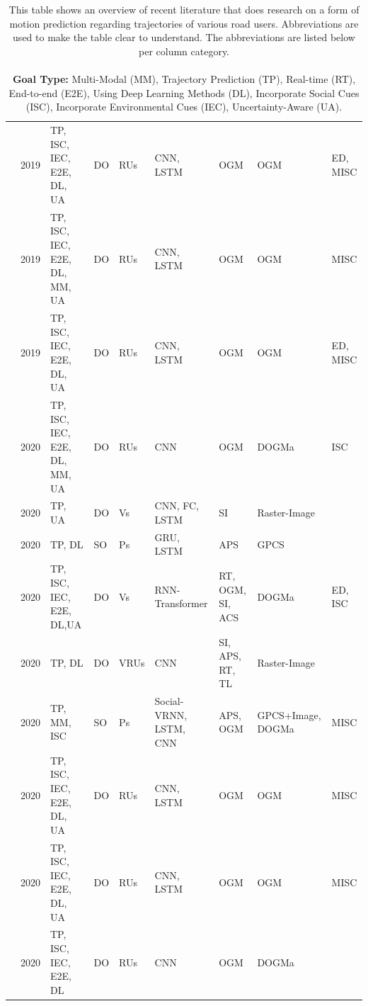 \begin{table}[h!]
{\begin{tabular}{lllllllll}
			\cite{itkina2019dynamic} & 2019 & TP, ISC, IEC, E2E, DL, UA & DO & RUs & CNN, LSTM & OGM & OGM & ED, MISC \\
			\cite{schreiber2019long} & 2019 & TP, ISC, IEC, E2E, DL, MM, UA & DO & RUs & CNN, LSTM & OGM & OGM & MISC \\
			\cite{mohajerin2019multi} & 2019 & TP, ISC, IEC, E2E, DL, UA & DO & RUs & CNN, LSTM & OGM & OGM & ED, MISC \\
			\cite{hormann2020long} & 2020 & TP, ISC, IEC, E2E, DL, MM, UA & DO & RUs & CNN & OGM & DOGMa & ISC \\
			\cite{djuric2020uncertainty} & 2020 & TP, UA & DO & Vs & CNN, FC, LSTM & SI & Raster-Image &  \\
			\cite{das2020accurate} & 2020 & TP, DL & SO & Ps & GRU, LSTM & APS & GPCS &  \\
			\cite{li2020end} & 2020 & TP, ISC, IEC, E2E, DL,UA & DO & Vs & RNN-Transformer & RT, OGM, SI, ACS & DOGMa & ED, ISC \\
			\cite{chou2020predicting} & 2020 & TP, DL & DO & VRUs & CNN & SI, APS, RT, TL & Raster-Image &  \\
			\cite{brito2020social} & 2020 & TP, MM, ISC & SO & Ps & Social-VRNN, LSTM, CNN & APS, OGM & GPCS+Image, DOGMa & MISC \\
			\cite{lange2020attention} & 2020 & TP, ISC, IEC, E2E, DL, UA & DO & RUs & CNN, LSTM & OGM & OGM & MISC \\
			\cite{toyungyernsub2020double} & 2020 & TP, ISC, IEC, E2E, DL, UA & DO & RUs & CNN, LSTM & OGM & OGM & MISC \\
			\cite{wu2020motionnet} & 2020 & TP, ISC, IEC, E2E, DL & DO & RUs & CNN & OGM & DOGMa &  \\
			\bottomrule
		\end{tabular}
	}
	\caption{This table shows an overview of recent literature that does research on a form of motion prediction regarding trajectories of various road users. Abbreviations are used to make the table clear to understand. The abbreviations are listed below per column category. \\\hspace{\textwidth} \\\hspace{\textwidth}
		\textbf{Goal Type:} 
		Multi-Modal (MM),
		Trajectory Prediction (TP),
		Real-time (RT),
		End-to-end (E2E),
		Using Deep Learning Methods (DL),
		Incorporate Social Cues (ISC),
		Incorporate Environmental Cues (IEC),
		Uncertainty-Aware (UA). \\\hspace{\textwidth} 
}
\end{table}
